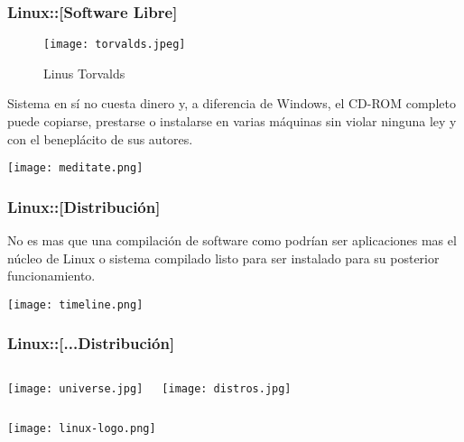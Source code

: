 \documentclass[xcolor=svgnames]{beamer}
\begin{document}

	\begin{frame}
	
		\frametitle{\textbf{Linux:}:[Software Libre]}
		
			\begin{wrapfigure}{r}{40mm}
				\begin{center}
					\texttt{[image: torvalds.jpeg]}
				\end{center}
				\caption{Linus Torvalds}
			\end{wrapfigure}
			
			Sistema en s\'i no cuesta dinero y, a diferencia de Windows, el CD-ROM completo puede copiarse, prestarse o instalarse en varias m\'aquinas sin violar ninguna ley y con el benepl\'acito de sus autores.
			
			\texttt{[image: meditate.png]}
			
	\end{frame}


	\begin{frame}
	
		\frametitle{\textbf{Linux:}:[Distribuci\'on]}
		
			No es mas que una compilaci\'on de software como podr\'ian ser aplicaciones mas el n\'ucleo de Linux o sistema compilado listo para ser instalado para su posterior funcionamiento. 
			
			\begin{center}
				\texttt{[image: timeline.png]}
			\end{center}
			
	\end{frame}


	\begin{frame}
	
		\frametitle{\textbf{Linux:}:[...Distribuci\'on]}
		
			\begin{columns}
			
				\column{0.5\textwidth}
					\texttt{[image: universe.jpg]}

				\column{0.5\textwidth}
					\texttt{[image: distros.jpg]}
					
			\end{columns}
			
			\begin{center}
				\texttt{[image: linux-logo.png]} 
			\end{center}
			
	\end{frame}
\end{document}
